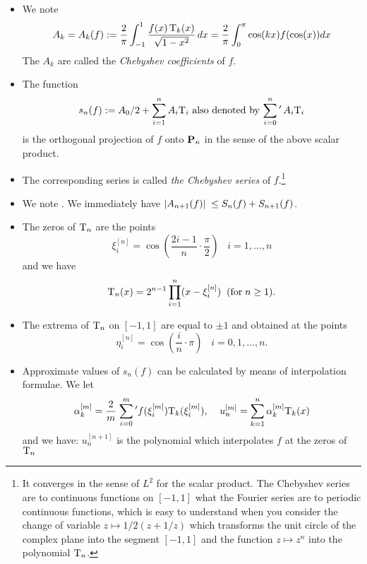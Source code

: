 \begin{notation}
\begin{itemize}
\item [] 
We note
\[
A_k = A_k(f):= \frac {2} {\pi} \int_{-1}^{1}  \frac {f(x)\,{\rm T}_k(x)} {\sqrt {1-x^2}}\, {dx}= \frac {2} {\pi} \int_{0}^{\pi} \cos (kx) f(\cos (x))dx
\]
The $A_k$ are called the \emph{Chebyshev  coefficients} of $f$.

\item [] 
The function 
\[
s_n(f) := A_0/2 + \sum_{i=1}^{n}A_i{\rm T}_i  \hbox{ also denoted by } 
 {\sum_{i=0}^n}\,'\, A_i{\rm T}_i
\]  
is the orthogonal projection of $f$ onto ${\bf P}_n$ in the sense of the above scalar product. 

\item [] 
The corresponding series is called {\em the Chebyshev series} of $f$.\footnote{It converges in the sense of $L^2$ for the scalar product. The Chebyshev series are to continuous functions on $[-1,1]$ what the Fourier series are to periodic continuous functions, which is easy to understand when you consider the change of variable $z\mapsto 1/2( z + 1/z )$ which transforms the unit circle of the complex plane into the segment $[-1,1]$ and the function $z\mapsto z^n$ into the polynomial ${\rm T}_n$.} 

\item [] 
We note .
We immediately have $\left|{A_{n+1}(f)}\right|\; \leq S_n(f) + S_{n+1}(f)$. 

\item [] 
The zeros of ${\rm T}_n$ are the points 
\[
\xi_i^{[n]} = \cos \left(\frac{2i-1} {n}\cdot \frac {\pi} {2}\right) \; \; \; i =1,\ldots,n
\]
and we have 
\[
{\rm T}_n(x) = 2^{n-1} \prod_{i=1}^{n} (x - \xi_i^{[n]}) \; \; ({\rm for}\; n \geq 1).
\] 

\item [] 

The extrema of ${\rm T}_n$ on $[-1,1]$ are equal to $\pm 1$ and obtained at the points
\[
\eta_i^{[n]} = \cos (\frac{i} {n}\cdot \pi) \; \; \; i =0,1,\ldots,n.
\] 

\item [] 

Approximate values of $s_n(f)$ can be calculated by means of interpolation formulae. We let
\[
\alpha_k^{[m]} = \frac {2} {m} \;
{\sum_{i=0}^m}\,'f(\xi_i^{[m]}){\rm T}_k(\xi_i^{[m]}), \; \; \; \; u_n^{[m]} = \sum_{k=1}^{n} \alpha_k^{[m]}{\rm T}_k(x)
\]
and we have: $u_n^{[n+1]}$ is the polynomial which interpolates $f$ at the zeros of ${\rm T}_{n}$
\end{itemize}
\end{notation}

